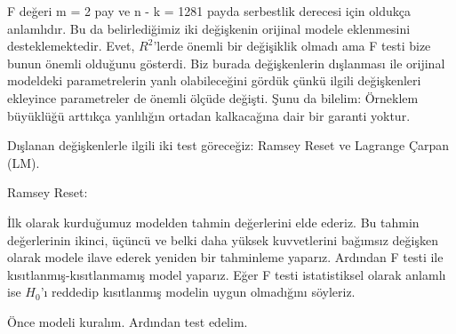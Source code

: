 \documentclass[
]{book}
\newenvironment{Shaded}{\begin{snugshade}}{\end{snugshade}}
\newcommand{\DataTypeTok}[1]{\textcolor[rgb]{0.13,0.29,0.53}{#1}}
\newcommand{\DecValTok}[1]{\textcolor[rgb]{0.00,0.00,0.81}{#1}}
\newcommand{\KeywordTok}[1]{\textcolor[rgb]{0.13,0.29,0.53}{\textbf{#1}}}
\newcommand{\NormalTok}[1]{#1}
\newcommand{\OperatorTok}[1]{\textcolor[rgb]{0.81,0.36,0.00}{\textbf{#1}}}
\newcommand{\StringTok}[1]{\textcolor[rgb]{0.31,0.60,0.02}{#1}}
\begin{document}
F değeri m = 2 pay ve n - k = 1281 payda serbestlik derecesi için oldukça anlamlıdır. Bu da belirlediğimiz iki değişkenin orijinal modele eklenmesini desteklemektedir. Evet, \(R^2\)'lerde önemli bir değişiklik olmadı ama F testi bize bunun önemli olduğunu gösterdi. Biz burada değişkenlerin dışlanması ile orijinal modeldeki parametrelerin yanlı olabileceğini gördük çünkü ilgili değişkenleri ekleyince parametreler de önemli ölçüde değişti. Şunu da bilelim: Örneklem büyüklüğü arttıkça yanlılığın ortadan kalkacağına dair bir garanti yoktur.

Dışlanan değişkenlerle ilgili iki test göreceğiz: Ramsey Reset ve Lagrange Çarpan (LM).

Ramsey Reset:

İlk olarak kurduğumuz modelden tahmin değerlerini elde ederiz. Bu tahmin değerlerinin ikinci, üçüncü ve belki daha yüksek kuvvetlerini bağımsız değişken olarak modele ilave ederek yeniden bir tahminleme yaparız. Ardından F testi ile kısıtlanmış-kısıtlanmamış model yaparız. Eğer F testi istatistiksel olarak anlamlı ise \(H_0\)'ı reddedip kısıtlanmış modelin uygun olmadığını söyleriz.

Önce modeli kuralım. Ardından test edelim.

\begin{Shaded}
\end{Shaded}
\end{document}
